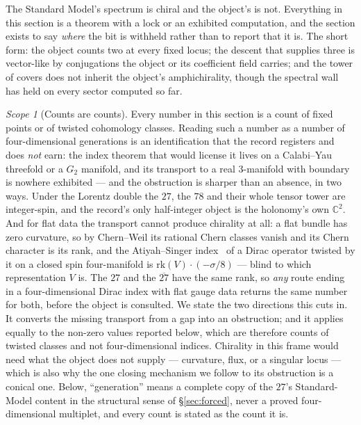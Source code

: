 \documentclass[11pt,a4paper]{article}
\theoremstyle{definition}
\theoremstyle{remark}
\newtheorem{scopenote}{Scope}
\begin{document}
The Standard Model's spectrum is chiral and the object's is not. Everything in this section is a theorem with a
lock or an exhibited computation, and the section exists to say \emph{where} the bit is withheld rather than to
report that it is. The short form: the object counts two at every fixed locus; the descent that supplies three
is vector-like by conjugations the object or its coefficient field carries; and the tower of covers does not
inherit the object's amphichirality, though the spectral wall has held on every sector computed so far.

\begin{scopenote}[Counts are counts]
Every number in this section is a count of fixed points or of twisted cohomology classes. Reading such a number
as a number of four-dimensional generations is an identification that the record registers and does \emph{not}
earn: the index theorem that would license it lives on a Calabi--Yau threefold or a $G_2$ manifold, and its
transport to a real 3-manifold with boundary is nowhere exhibited --- and the obstruction is sharper than an absence, in two ways. Under the Lorentz double the $27$, the $78$ and their whole tensor tower are integer-spin, and the record's only half-integer object is the holonomy's own $\mathbb{C}^2$. And for flat data the transport cannot produce chirality at all: a flat bundle has zero curvature, so by Chern--Weil its rational Chern classes vanish and its Chern character is its rank, and the Atiyah--Singer index~\cite{atiyahsinger} of a Dirac operator twisted by it on a closed spin four-manifold is $\mathrm{rk}(V)\cdot(-\sigma/8)$ --- blind to which representation $V$ is. The $27$ and the $\overline{27}$ have the same rank, so \emph{any} route ending in a four-dimensional Dirac index with flat gauge data returns the same number for both, before the object is consulted. We state the two directions this cuts in. It converts the missing transport from a gap into an obstruction; and it applies equally to the non-zero values reported below, which are therefore counts of twisted classes and not four-dimensional indices. Chirality in this frame would need what the object does not supply --- curvature, flux, or a singular locus --- which is also why the one closing mechanism we follow to its obstruction is a conical one. Below, ``generation'' means a complete copy of
the $27$'s Standard-Model content in the structural sense of \S\ref{sec:forced}, never a proved four-dimensional
multiplet, and every count is stated as the count it is.
\end{scopenote}
\end{document}
